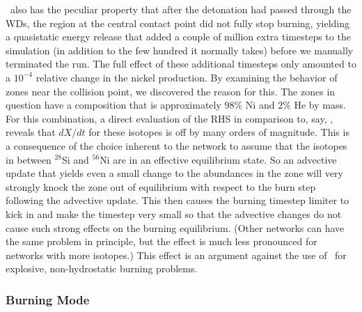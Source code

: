 \documentclass[12pt]{article}
\begin{document}


\isoseven\ also has the peculiar property that after the detonation had passed through the WDs,
the region at the central contact point did not fully stop burning, yielding a quasistatic energy
release that added a couple of million extra timesteps to the simulation (in addition to the few
hundred it normally takes) before we manually terminated the run. The full effect of these additional
timesteps only amounted to a $10^{-4}$ relative change in the nickel production. By examining the behavior
of zones near the collision point, we discovered the reason for this. The zones in question have a composition that
is approximately $98\%$ Ni and $2\%$ He by mass. For this combination, a direct evaluation of the RHS in
comparison to, say, \aproxthirteen, reveals that $dX/dt$ for these isotopes is off by many orders of magnitude.
This is a consequence of the choice inherent to the network to assume that the isotopes in between $^{28}$Si
and $^{56}$Ni are in an effective equilibrium state. So an advective update that yields even a small change
to the abundances in the zone will very strongly knock the zone out of equilibrium with respect to the burn
step following the advective update. This then causes the burning timestep limiter to kick in and make the
timestep very small so that the advective changes do not cause such strong effects on the burning equilibrium.
(Other networks can have the same problem in principle, but the effect is much less pronounced for networks with more isotopes.)
This effect is an argument against the use of \isoseven\ for explosive, non-hydrostatic burning problems.

\subsubsection{Burning Mode}
\label{sec:collision_parameters:burningmode}
\end{document}

